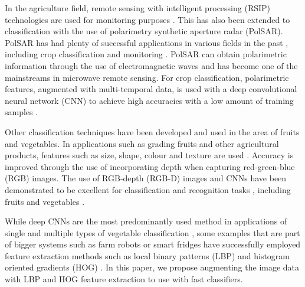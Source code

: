 In the agriculture field, remote sensing with intelligent processing (RSIP) technologies are used for monitoring purposes \cite{b2_1}. This has also been extended to classification with the use of polarimetry synthetic aperture radar (PolSAR). PolSAR has had plenty of successful applications in various fields in the past \cite{b2_2,b2_3,b2_4}, including crop classification and monitoring \cite{b2_5,b2_6}. PolSAR can obtain polarimetric information through the use of electromagnetic waves and has become one of the mainstreams in microwave remote sensing. For crop classification, polarimetric features, augmented with multi-temporal data, is used with a deep convolutional neural network (CNN) to achieve high accuracies with a low amount of training samples \cite{b2_7}.

Other classification techniques have been developed and used in the area of fruits and vegetables. In applications such as grading fruits and other agricultural products, features such as size, shape, colour and texture are used \cite{b2_8,b2_9,b2_10}. Accuracy is improved through the use of incorporating depth when capturing red-green-blue (RGB) images. The use of RGB-depth (RGB-D) images and CNNs have been demonstrated to be excellent for classification and recognition tasks \cite{b2_11,b2_12}, including fruits and vegetables \cite{b2_13}.

While deep CNNs are the most predominantly used method in applications of single and multiple types of vegetable classification \cite{b2_14,b2_15,b2_16}, some examples that are part of bigger systems such as farm robots \cite{b2_17} or smart fridges \cite{b2_18} have successfully employed feature extraction methods such as local binary patterns (LBP) and histogram oriented gradients (HOG) \cite{b2_19,b2_20}. In this paper, we propose augmenting the image data with LBP and HOG feature extraction to use with fast classifiers.